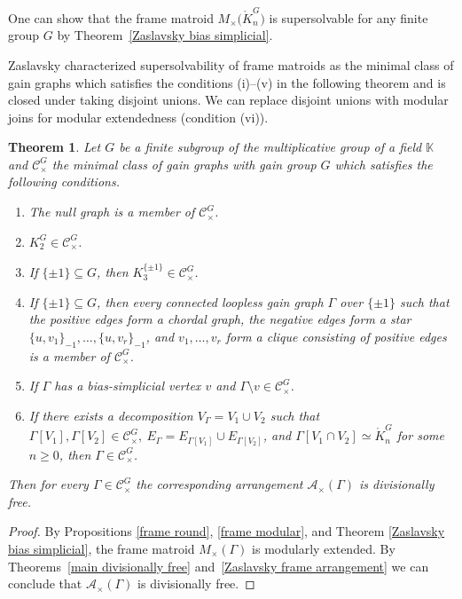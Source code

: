 \documentclass[pdftex]{sigma}
\numberwithin{equation}{section}
\newtheorem{Theorem}{Theorem}[section]
\begin{document}
One can show that the frame matroid $ M_{\times}\big(\mathring{K}_{n}^{G}\big) $ is supersolvable for any finite group $ G $ by Theorem~\ref{Zaslavsky bias simplicial}.

Zaslavsky \cite[Theorem 2.2]{zaslavsky2001supersolvable-ejoc} characterized supersolvability of frame matroids as the minimal class of gain graphs which satisfies the conditions (i)--(v) in the following theorem and is closed under taking disjoint unions.
We can replace disjoint unions with modular joins for modular extendedness (condition (vi)).

\begin{Theorem}\label{main frame}
Let $ G $ be a finite subgroup of the multiplicative group of a field $ \mathbb{K} $ and $ \mathcal{C}^{G}_{\times} $ the minimal class of gain graphs with gain group $ G $ which satisfies the following conditions.
\begin{enumerate}[$(i)$]\itemsep=0pt
\item The null graph is a member of $ \mathcal{C}^{G}_{\times} $.
\item $ K_{2}^{G} \in \mathcal{C}^{G}_{\times} $.
\item If $ \{\pm 1 \} \subseteq G $, then $ K_{3}^{\{\pm 1\}} \in \mathcal{C}^{G}_{\times} $.
\item If $ \{\pm 1 \} \subseteq G $, then every connected loopless gain graph $ \Gamma $ over $ \{\pm 1\} $ such that the positive edges form a chordal graph, the negative edges form a star $ \{u, v_{1} \}_{-1}, \dots, \{u, v_{r}\}_{-1} $, and $ v_{1}, \dots, v_{r} $ form a clique consisting of positive edges is a member of $ \mathcal{C}^{G}_{\times} $.
\item If $ \Gamma $ has a bias-simplicial vertex $ v $ and $ \Gamma \setminus v \in \mathcal{C}^{G}_{\times}$.
\item If there exists a decomposition $ V_{\Gamma} = V_{1} \cup V_{2} $ such that $ \Gamma[V_{1}], \Gamma[V_{2}] \in \mathcal{C}^{G}_{\times}, \ E_{\Gamma} = E_{\Gamma[V_{1}]} \cup E_{\Gamma[V_{2}]} $, and $ \Gamma[V_{1} \cap V_{2}] \simeq \mathring{K}_{n}^{G} $ for some $ n \geq 0 $, then $ \Gamma \in \mathcal{C}^{G}_{\times} $.
\end{enumerate}
Then for every $ \Gamma \in \mathcal{C}^{G}_{\times} $ the corresponding arrangement $ \mathcal{A}_{\times}(\Gamma) $ is divisionally free.
\end{Theorem}
\begin{proof}
By Propositions \ref{frame round}, \ref{frame modular}, and Theorem \ref{Zaslavsky bias simplicial}, the frame matroid $ M_{\times}(\Gamma) $ is modularly extended. By Theorems~\ref{main divisionally free} and~\ref{Zaslavsky frame arrangement} we can conclude that $ \mathcal{A}_{\times}(\Gamma) $ is divisionally free.
\end{proof}
\end{document}
